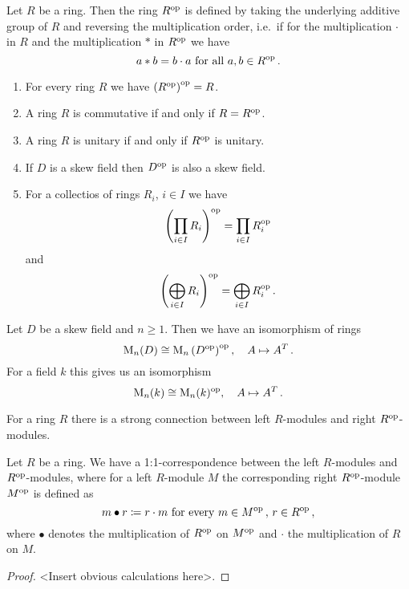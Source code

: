 \begin{defi}
  Let $R$ be a ring. Then the ring $R^{\mathrm{op}}$ is defined by taking the underlying additive group of $R$ and reversing the multiplication order, i.e.\ if for the multiplication $\cdot$ in $R$ and the multiplication $*$ in $R^{\mathrm{op}}$ we have
  \[
      a * b
    = b \cdot a
    \text{ for all }
    a, b \in R^{\mathrm{op}} \,.
  \]
\end{defi}


\begin{rem}
  \begin{enumerate}[label=\emph{\alph*)},leftmargin=*]
    \item
      For every ring $R$ we have $\left( R^{\mathrm{op}} \right)^{\mathrm{op}} = R$.
    \item
      A ring $R$ is commutative if and only if $R = R^{\mathrm{op}}$.
    \item
      A ring $R$ is unitary if and only if $R^{\mathrm{op}}$ is unitary.
    \item
      If $D$ is a skew field then $D^{\mathrm{op}}$ is also a skew field.
    \item
      For a collectios of rings $R_i$, $i \in I$ we have
      \[
          \left( \prod_{i \in I} R_i \right)^{\mathrm{op}}
        = \prod_{i \in I} R_i^{\mathrm{op}}
      \]
      and
      \[
          \left( \bigoplus_{i \in I} R_i \right)^{\mathrm{op}}
        = \bigoplus_{i \in I} R_i^{\mathrm{op}} \,.
      \]
  \end{enumerate}
\end{rem}


\begin{expl}
  Let $D$ be a skew field and $n \geq 1$.
  Then we have an isomorphism of rings
  \[
            \operatorname{M}_n(D)
    \cong   \operatorname{M}_n\left( D^{\mathrm{op}} \right)^{\mathrm{op}},
    \quad   A
    \mapsto A^T \,.
  \]
  For a field $k$ this gives us an isomorphism
  \[
            \operatorname{M}_n(k)
    \cong   \operatorname{M}_n(k)^{\mathrm{op}},
    \quad   A
    \mapsto A^T \,.
  \]
\end{expl}


For a ring $R$ there is a strong connection between left $R$-modules and right $R^{\mathrm{op}}$-modules.


\begin{prop}\label{prop: opposite modules}
  Let $R$ be a ring.
  We have a 1:1-correspondence between the left $R$-modules and $R^{\mathrm{op}}$-modules, where for a left $R$-module $M$ the corresponding right $R^{\mathrm{op}}$-module $M^{\mathrm{op}}$ is defined as
  \[
              m \bullet r
    \coloneqq r \cdot m
    \text{ for every }
    m \in M^{\mathrm{op}} \,,\,
    r \in R^{\mathrm{op}} \,,
  \]
  where $\bullet$ denotes the multiplication of $R^{\mathrm{op}}$ on $M^{\mathrm{op}}$ and $\cdot$ the multiplication of $R$ on $M$.
\end{prop}
\begin{proof}
  <Insert obvious calculations here>.
\end{proof}


